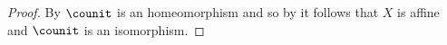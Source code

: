 
\begin{proof}
By  $\counit$ is an homeomorphism 
and so by  it follows that $X$ is affine and $\counit$ is an isomorphism.
\end{proof}